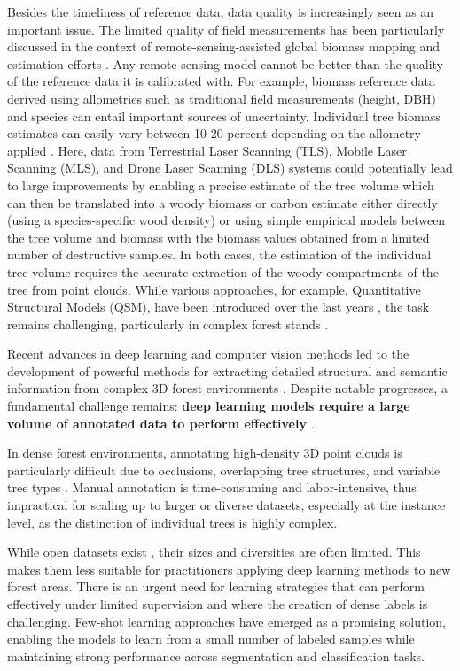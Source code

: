 \documentclass[review,authoryear]{elsarticle}
\begin{document}
Besides the timeliness of reference data, data quality is increasingly seen as an important issue. The limited quality of field measurements has been particularly discussed in the context of remote-sensing-assisted global biomass mapping and estimation efforts \citep{vorster2020variability}. Any remote sensing model cannot be better than the quality of the reference data it is calibrated with. For example, biomass reference data derived using allometries such as traditional field measurements (height, DBH) and species can entail important sources of uncertainty. Individual tree biomass estimates can easily vary between 10-20 percent depending on the allometry applied \citep{duncanson2017implications}. Here, data from Terrestrial Laser Scanning (TLS), Mobile Laser Scanning (MLS), and Drone Laser Scanning (DLS) systems could potentially lead to large improvements by enabling a precise estimate of the tree volume which can then be translated into a woody biomass or carbon estimate either directly (using a species-specific wood density) or using simple empirical models between the tree volume and biomass with the biomass values obtained from a limited number of destructive samples. In both cases, the estimation of the individual tree volume requires the accurate extraction of the woody compartments of the tree from point clouds. While various approaches, for example, Quantitative Structural Models (QSM), have been introduced over the last years \citep{brede2019non}, the task remains challenging, particularly in complex forest stands \citep{morhart2024limitations}.

Recent advances in deep learning and computer vision methods led to the development of powerful methods for extracting detailed structural and semantic information from complex 3D forest environments \citep{HENRICH2024102888, XIANG2024114078, WIELGOSZ2024114367}. Despite notable progresses, a fundamental challenge remains: \textbf{deep learning models require a large volume of annotated data to perform effectively} \citep{krizhevsky2012imagenet}. 

In dense forest environments, annotating high-density 3D point clouds is particularly difficult due to occlusions, overlapping tree structures, and variable tree types \citep{Puliti2023FORinstance}. Manual annotation is time-consuming and labor-intensive, thus impractical for scaling up to larger or diverse datasets, especially at the instance level, as the distinction of individual trees is highly complex. 

While open datasets exist \citep{Puliti2023FORinstance, Puliti2025}, their sizes and diversities are often limited. This makes them less suitable for practitioners applying deep learning methods to new forest areas. There is an urgent need for learning strategies that can perform effectively under limited supervision and where the creation of dense labels is challenging. Few-shot learning approaches have emerged as a promising solution, enabling the models to learn from a small number of labeled samples while maintaining strong performance across segmentation and classification tasks.
\end{document}
